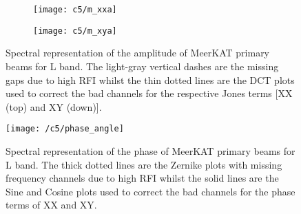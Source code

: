  \begin{figure}
\begin{minipage}[H]{\linewidth}
\centering
    \begin{subfigure}[b]{1.0\textwidth}
	      \texttt{[image: c5/m\_xxa]}               
	      \caption{}                
	      \label{fig:implota}
      \end{subfigure}       
      \begin{subfigure}[b]{1.0\textwidth}
	      \texttt{[image: c5/m\_xya]}                
	      \caption{}               
	      \label{fig:implotb}
      \end{subfigure}        
	\end{minipage}
      \caption{\label{fig:se_ampl} Spectral representation of the amplitude of MeerKAT primary beams for L band. The light-gray vertical dashes are the missing gaps due to high RFI whilst the thin dotted lines are the DCT plots used to correct the bad channels for the respective Jones terms [XX (top) and XY (down)].}
	\end{figure}
\FloatBarrier
%


\begin{figure}
\begin{minipage}[H]{\linewidth}
\centering
\texttt{[image: /c5/phase\_angle]}
\caption{\label{fig:sp_phse} Spectral representation of the phase of MeerKAT primary beams for L band.
                                     The thick dotted lines are the Zernike plots with missing frequency channels due to high RFI whilst
                                     the solid lines are the Sine and Cosine plots used to correct the bad channels 
                                     for the phase terms of XX and XY.}
      \end{minipage}
\end{figure}
\FloatBarrier


